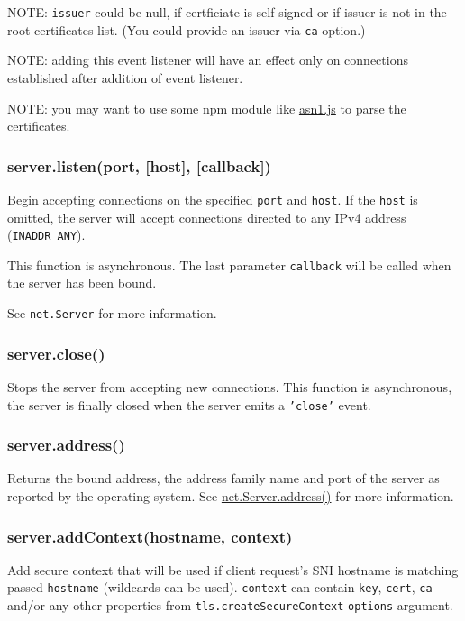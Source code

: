 NOTE: \texttt{issuer} could be null, if certficiate is self-signed or if
issuer is not in the root certificates list. (You could provide an
issuer via \texttt{ca} option.)

NOTE: adding this event listener will have an effect only on connections
established after addition of event listener.

NOTE: you may want to use some npm module like
\href{http://npmjs.org/package/asn1.js}{asn1.js} to parse the
certificates.

\subsubsection{server.listen(port, {[}host{]},
{[}callback{]})}\label{server.listenport-host-callback}

Begin accepting connections on the specified \texttt{port} and
\texttt{host}. If the \texttt{host} is omitted, the server will accept
connections directed to any IPv4 address (\texttt{INADDR\_ANY}).

This function is asynchronous. The last parameter \texttt{callback} will
be called when the server has been bound.

See \texttt{net.Server} for more information.

\subsubsection{server.close()}\label{server.close}

Stops the server from accepting new connections. This function is
asynchronous, the server is finally closed when the server emits a
\texttt{'close'} event.

\subsubsection{server.address()}\label{server.address}

Returns the bound address, the address family name and port of the
server as reported by the operating system. See
\href{net.html\#net_server_address}{net.Server.address()} for more
information.

\subsubsection{server.addContext(hostname,
context)}\label{server.addcontexthostname-context}

Add secure context that will be used if client request's SNI hostname is
matching passed \texttt{hostname} (wildcards can be used).
\texttt{context} can contain \texttt{key}, \texttt{cert}, \texttt{ca}
and/or any other properties from \texttt{tls.createSecureContext}
\texttt{options} argument.

